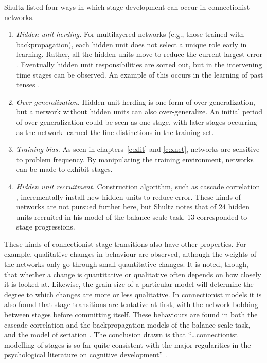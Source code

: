 Shultz listed four ways in which stage development can occur in
connectionist networks.
\begin{enumerate}

\item {\em Hidden unit herding.}  For multilayered networks
(e.g., those trained with backpropagation), each hidden unit does not
select a unique role early in learning. Rather, all the hidden units move
to reduce the current largest error \cite{cascor}.  Eventually hidden
unit responsibilities are sorted out, but in the intervening time stages
can be observed.  An example of this occurs in the learning of past tenses
\cite{pdp:18,plunfrom,marclang}.

\item  {\em Over generalization.}  Hidden unit herding is one form of over
generalization, but a network without hidden units can also
over-generalize.  An initial period of over generalization could be seen as
one
stage, with later stages occurring as the network learned the fine
distinctions in the training set.

\item {\em Training
bias.}  As seen in chapters~\ref{c:xlit} and \ref{c:xnet},
networks are sensitive to problem frequency.
By manipulating the training environment, networks can be made to exhibit
stages.

\item {\em Hidden unit recruitment.} Construction algorithm, such as
cascade correlation \cite{cascor,rcascor}, incrementally
install new hidden units to reduce error.  These kinds of networks are not
pursued further here, but Shultz notes that of 24 hidden units recruited in
his model of the balance scale task, 13 corresponded to stage progressions.
\end{enumerate}

These kinds of connectionist stage transitions also have other properties.
For example, qualitative changes in behaviour are observed, although the
weights of the networks only go through small quantitative changes. It is
noted, though, that whether a change is quantitative or qualitative often
depends on how closely it is looked at.   Likewise, the grain size of a
particular model will determine the degree to which changes are more or
less qualitative.  In connectionist models it is also found that stage
transitions are tentative at first, with the network bobbing between stages
before committing itself. These behaviours are found in both the cascade
correlation \cite{shulcasc} and the backpropagation \cite{mcclpara} models
of the balance scale task, and the model of seriation \cite{mareconn}.
The conclusion drawn is that ``\ldots connectionist modelling of stages is
so far quite consistent with the major regularities in the psychological
literature on cognitive development'' \cite[p.~109]{shulsimu}.


